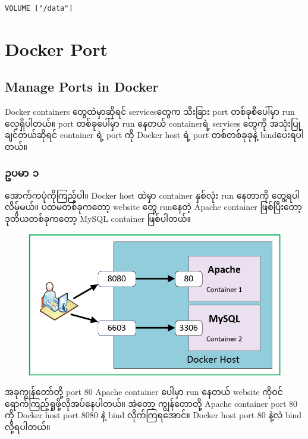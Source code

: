 \documentclass{article}
\begin{document}
\begin{verbatim}
VOLUME ["/data"]
\end{verbatim}

\pagebreak

\section{Docker Port}\label{docker-port}

\subsection{Manage Ports in Docker}\label{manage-ports-in-docker}

Docker containers တွေထဲမှာဆိုရင် servicesတွေက သီးခြား port
တစ်ခုစီပေါ်မှာ run လေ့ရှိပါတယ်။ port တစ်ခုပေါ်မှာ run နေတယ် containerရဲ့
services ‌တွေကို အသုံးပြုချင်တယ်ဆိုရင် container ရဲ့ port ကို Docker
host ရဲ့ port တစ်တစ်ခုခုနဲ့ bindပေးရပါတယ်။

\subsubsection{ဥပမာ ၁}\label{ux1025ux1015ux1019}

အောက်‌ကပုံကိုကြည့်ပါ။ Docker host ထဲမှာ container နှစ်လုံး run နေတာကို
တွေ့ရပါလိမ့်မယ်။ ပထမတစ်ခုကတော့ website တွေ runနေတဲ့ Apache container
ဖြစ်ပြီးတော့ ဒုတိယတစ်ခုကတော့ MySQL container ဖြစ်ပါတယ်။

\begin{figure}[htbp]
\centering
\includegraphics[width=0.70\paperwidth]{.gitbook/assets/screenshot-132.png}
\end{figure}

အခုကျွန်တော်တို့ port 80 Apache container ပေါမှာ run နေတယ် website
ကိုဝင်ရောက်ကြည့်ရှုဖို့လိုအပ်နေပါတယ်။ အဲတော့ ကျွန်တောတို့ Apache
container port 80 ကို Docker host port 8080 နဲ့ bind လိုက်ကြရအောင်။
Docker host port 80 နဲ့လဲ bind လို့ရပါတယ်။
\end{document}
